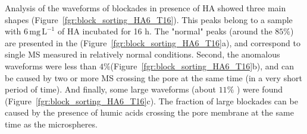 \documentclass[journal=langd5,manuscript=article]{achemso}
\begin{document}
Analysis of the waveforms of blockades in presence of HA showed three main shapes (Figure~\ref{fgr:block_sorting_HA6_T16}). This peaks belong to a sample with  $\mathrm{6\, mg\, L^{-1}}$  of HA incubated for 16 h. The "normal" peaks (around the $85\%$) are presented in the (Figure~\ref{fgr:block_sorting_HA6_T16}a), and correspond to single MS measured in relatively normal conditions. Second, the anomalous  waveforms were less than  $4\%$(Figure~\ref{fgr:block_sorting_HA6_T16}b), and can be caused by two or more MS crossing the pore at the same time (in a very short period of time). And finally, some large waveforms (about $11\%$ ) were found (Figure~\ref{fgr:block_sorting_HA6_T16}c). The fraction of large blockades can be caused by the presence of humic acids crossing the pore membrane at the same time as the microspheres. 
\end{document}
